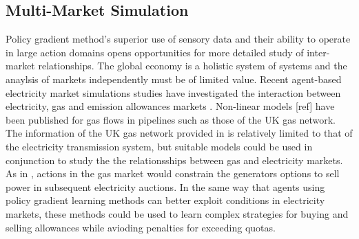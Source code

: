 \subsection{Multi-Market Simulation}
Policy gradient method's superior use of sensory data and their ability to
operate in large action domains opens opportunities for more detailed study of
inter-market relationships.  The global economy is a holistic system of
systems and the anaylsis of markets independently must be of limited value.
Recent agent-based electricity market simulations studies have investigated the
interaction between electricity, gas and emission allowances markets
\cite{krause:gas,wang:09}.
Non-linear models [ref] have been published for gas flows in pipelines such as
those of the UK gas network.  The information of the UK gas network provided in
 is relatively limited to that of the electricity
transmission system, but suitable models could be used in conjunction
to study the the relationsships between gas and electricity markets. As in
, actions in the gas market would constrain the generators
options to sell power in subsequent electricity auctions.  In the same way
that agents using policy gradient learning methods can better exploit
conditions in electricity markets, these methods could be used to learn
complex strategies for buying and selling allowances while avioding penalties
for exceeding quotas.

%
%


